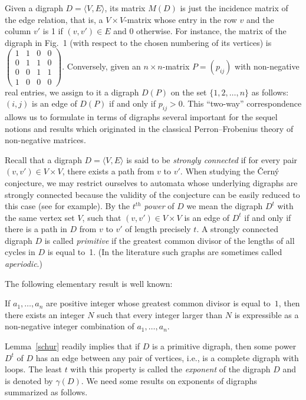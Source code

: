 \documentclass[11pt]{llncs}
\begin{document}
Given a digraph $D=\langle V,E\rangle$, its matrix $M(D)$ is just
the incidence matrix of the edge relation, that is, a $V\times V$-matrix
whose entry in the row $v$ and the column $v'$ is 1 if $(v,v')\in E$ and
0 otherwise. For instance, the matrix of the digraph in Fig.~1 (with respect
to the chosen numbering of its vertices) is $\left(\begin{smallmatrix}1&1&0&0\\
0&1&1&0\\ 0&0&1&1\\ 1&0&0&0 \end{smallmatrix}\right)$. Conversely, given
an $n\times n$-matrix $P=(p_{ij})$ with non-negative real entries, we assign
to it a digraph $D(P)$ on the set $\{1,2,\dots,n\}$ as follows: $(i,j)$ is an
edge of $D(P)$ if and only if $p_{ij}>0$. This ``two-way'' correspondence
allows us to formulate in terms of digraphs several important for the sequel
notions and results which originated in the classical Perron--Frobenius theory
of non-negative matrices.

Recall that a digraph $D=\langle V,E\rangle$ is said to be \emph{strongly
connected} if for every pair $(v,v')\in V\times V$, there exists a path
from $v$ to $v'$. When studying the \v{C}ern\'{y} conjecture, we may
restrict ourselves to automata whose underlying digraphs are strongly
connected because the validity of the conjecture can be easily reduced
to this case (see \cite{Pi78} for example). By the $t^{th}$ \emph{power}
of $D$ we mean the digraph $D^t$ with the same vertex set $V$, such that
$(v,v')\in V\times V$ is an edge of $D^t$ if and only if there is a path
in $D$ from $v$ to $v'$ of length precisely $t$. A strongly connected digraph
$D$ is called \emph{primitive} if the greatest common divisor of the lengths
of all cycles in $D$ is equal to~1. (In the literature such graphs are sometimes
called \emph{aperiodic}.)

The following elementary result is well known:
\begin{lemma}
\label{schur}
If $a_1,\dots,a_n$ are positive integer whose greatest common divisor is equal
to~$1$, then there exists an integer $N$ such that every integer larger than $N$
is expressible as a non-negative integer combination of $a_1,\dots,a_n$.
\end{lemma}
Lemma~\ref{schur} readily implies that if $D$ is a primitive digraph, then some
power $D^t$ of $D$ has an edge between any pair of vertices, i.e., is a complete
digraph with loops. The least $t$ with this property is called the \emph{exponent}
of the digraph $D$ and is denoted by $\gamma(D)$. We need some results on exponents
of digraphs summarized as follows.
\end{document}
